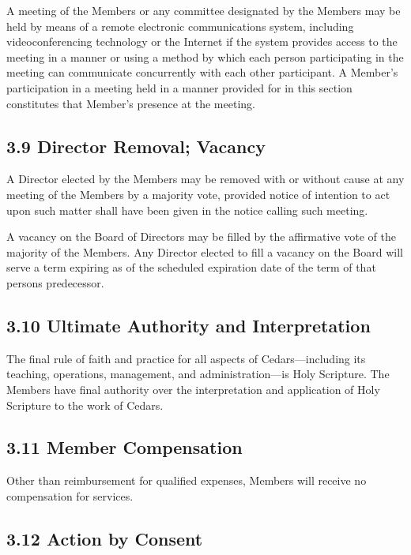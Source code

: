 \documentclass[
]{book}
\begin{document}
A meeting of the Members or any committee designated by the Members may be held by means of a remote electronic communications system, including videoconferencing technology or the Internet if the system provides access to the meeting in a manner or using a method by which each person participating in the meeting can communicate concurrently with each other participant. A Member's participation in a meeting held in a manner provided for in this section constitutes that Member's presence at the meeting.

\subsection{3.9 Director Removal; Vacancy}\label{director-removal-vacancy}

A Director elected by the Members may be removed with or without cause at any meeting of the Members by a majority vote, provided notice of intention to act upon such matter shall have been given in the notice calling such meeting.

A vacancy on the Board of Directors may be filled by the affirmative vote of the majority of the Members. Any Director elected to fill a vacancy on the Board will serve a term expiring as of the scheduled expiration date of the term of that person\textquotesingle s predecessor.

\subsection{3.10 Ultimate Authority and Interpretation}\label{ultimate-authority-and-interpretation}

The final rule of faith and practice for all aspects of Cedars---including its teaching, operations, management, and administration---is Holy Scripture. The Members have final authority over the interpretation and application of Holy Scripture to the work of Cedars.

\subsection{3.11 Member Compensation}\label{member-compensation}

Other than reimbursement for qualified expenses, Members will receive no compensation for services.

\subsection{3.12 Action by Consent}\label{action-by-consent}
\end{document}

